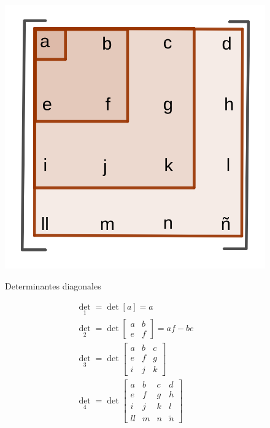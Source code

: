 \documentclass{article}
\begin{document}
\begin{figure}[ht]
\caption{Determinantes diagonales}
\includegraphics[scale=0.8]{img/teo_fig018_detdiag.png} 
\centering
\label{fig:detdiag}
\end{figure}

\begin{subequations}
\begin{gather}
\det_1 = \det [a] = a \\
\det_2 = \det \begin{bmatrix} a & b \\ e & f \end{bmatrix} = a f - b e \\
\det_3 = \det \begin{bmatrix} a & b & c \\ e & f & g \\ i & j & k \end{bmatrix} \\
\det_4 = \det \begin{bmatrix} a & b & c & d \\ e & f & g & h \\ i & j & k & l \\ ll & m & n & \tilde{n} \end{bmatrix}
\end{gather}
\end{subequations}
\end{document}
